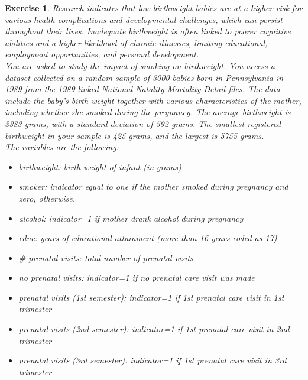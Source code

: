 \documentclass{article}
\newtheorem{exercise}[theorem]{Exercise}
\begin{document}
\begin{exercise} %
Research indicates that low birthweight babies are at a higher risk for various health complications and developmental challenges, which can persist throughout their lives. Inadequate birthweight is often linked to poorer cognitive abilities and a higher likelihood of chronic illnesses, limiting educational, employment opportunities, and personal development.\\

You are asked to study the impact of smoking on birthweight. You access a dataset collected on a random sample of 3000 babies born in Pennsylvania in 1989 from the 1989 linked National Natality-Mortality Detail files. The data include the baby’s birth weight together with various characteristics of the mother, including whether she smoked during the pregnancy. The average birthweight is 3383 grams, with a standard deviation of 592 grams. The smallest registered birthweight in your sample is 425 grams, and the largest is 5755 grams.\\

The variables are the following:
\begin{itemize}
    \item[-] birthweight: birth weight of infant (in grams)
    \item[-] smoker: indicator equal to one if the mother smoked during pregnancy and zero, otherwise.
    \item[-] alcohol: indicator=1 if mother drank alcohol during pregnancy
    \item[-] educ: years of educational attainment (more than 16 years coded as 17)
    \item[-] \# prenatal visits: total number of prenatal visits
    \item[-] no prenatal visits: indicator=1 if no prenatal care visit was made
    \item[-] prenatal visits (1st semester): indicator=1 if 1st prenatal care visit in 1st trimester
    \item[-] prenatal visits (2nd semester): indicator=1 if 1st prenatal care visit in 2nd trimester
    \item[-] prenatal visits (3rd semester): indicator=1 if 1st prenatal care visit in 3rd trimester
\end{itemize}

\vspace{.5cm}


\end{exercise}
\end{document}
